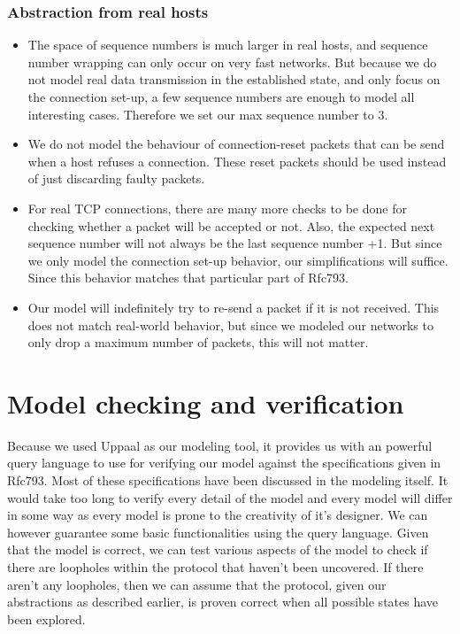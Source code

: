 \documentclass[twocolumn]{article}
\begin{document}
\subsubsection{Abstraction from real hosts}
\begin{itemize}
\item The space of sequence numbers is much larger in real hosts, and sequence number wrapping can only occur on very fast networks. But because we do not model real data transmission in the established state, and only focus on the connection set-up, a few sequence numbers are enough to model all interesting cases. Therefore we set our max sequence number to 3.
\item We do not model the behaviour of connection-reset packets that can be send when a host refuses a connection. These reset packets should be used instead of just discarding faulty packets.
\item For real TCP connections, there are many more checks to be done for checking whether a packet will be accepted or not. Also, the expected next sequence number will not always be the last sequence number +1. But since we only model the connection set-up behavior, our simplifications will suffice. Since this behavior matches that particular part of Rfc793.
\item Our model will indefinitely try to re-send a packet if it is not received. This does not match real-world behavior, but since we modeled our networks to only drop a maximum number of packets, this will not matter.
\end{itemize}






\section{Model checking and verification} %
\label{sec:model_checking_and_verification}
	Because we used Uppaal as our modeling tool, it provides us with an powerful query language to use for verifying our model against the specifications given in Rfc793. Most of these specifications have been discussed in the modeling itself. It would take too long to verify every detail of the model and every model will differ in some way as every model is prone to the creativity of it's designer. We can however guarantee some basic functionalities using the query language. Given that the model is correct, we can test various aspects of the model to check if there are loopholes within the protocol that haven't been uncovered. If there aren't any loopholes, then we can assume that the protocol, given our abstractions as described earlier, is proven correct when all possible states have been explored.
\end{document}
